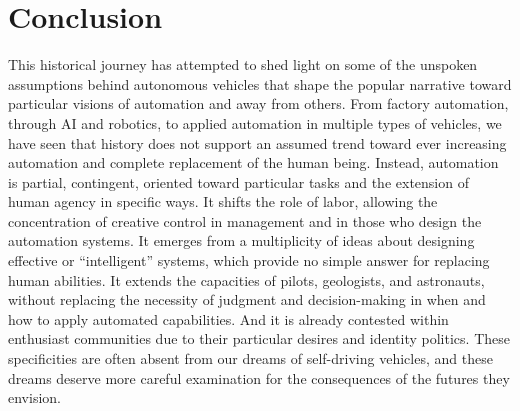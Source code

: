 
\section{Conclusion}


This historical journey has attempted
to shed light on some of the unspoken assumptions behind autonomous
vehicles that shape the popular narrative toward
particular visions of automation and away from others. From factory
automation, through AI and robotics, to applied automation in
multiple types of vehicles, we have seen that history does not support
an assumed trend toward ever increasing automation and complete
replacement of the human being. Instead, automation is partial,
contingent, oriented toward particular tasks and the extension of
human agency in specific ways. It shifts the role of labor, allowing
the concentration of creative control in management and in those who
design the automation systems. It emerges from a multiplicity of ideas
about designing effective or ``intelligent'' systems, which provide no
simple answer for replacing human abilities. It extends the capacities of
pilots, geologists, and astronauts, without replacing the necessity of
judgment and decision-making in when and how to apply automated
capabilities. And it is already contested within enthusiast
communities due to their particular desires and identity politics.
These specificities are often absent
from our dreams of self-driving vehicles, and these dreams deserve
more careful examination for the consequences of the futures they envision.






